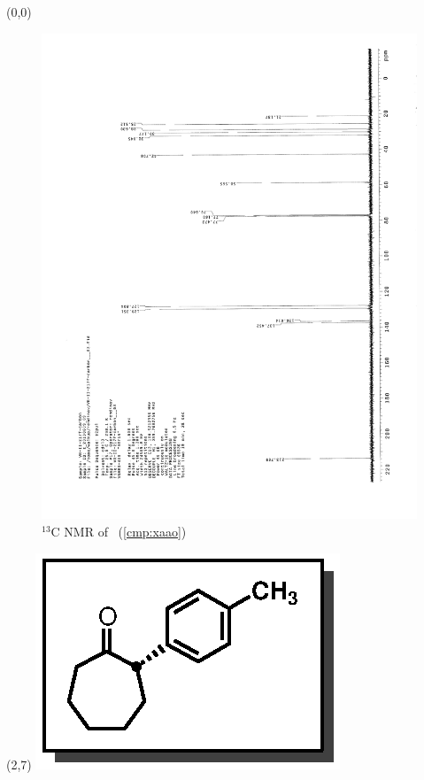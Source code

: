 \clearpage
\begin{textblock}{20}(0,0)
\begin{figure}[htb]
\caption{$^{13}$C NMR of  \CMPxaao\ (\ref{cmp:xaao})}
\includegraphics[scale=0.75, trim = 0mm 0mm 0mm 5mm,
clip]{chp_asymmetric/images/nmr/xaaoC}
\vspace{-100pt}
\end{figure}
\end{textblock}
\begin{textblock}{1}(2,7)
\includegraphics[scale=0.8, angle=90]{chp_asymmetric/images/xaao}
\end{textblock}
\clearpage

